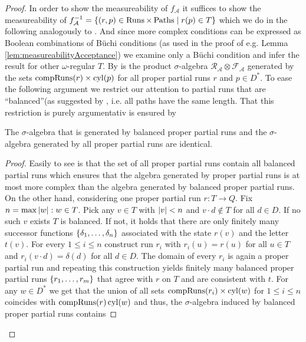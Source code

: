 \begin{proof}
  In order to show the measureability of $f_{\mathcal{A}}$ it suffices to show
  the measureability of $f_{\mathcal{A}}^{-1} =
  \left\{\left(r,p\right)\in\operatorname{Runs}\times\operatorname{Paths}\mid r(p)\in T\right\}$ which we do in the
  following analogously to \cite[Lemma 36]{RandAutoInfTrees}. And since more
  complex conditions can be expressed as Boolean combinations of Büchi
  conditions (as used in the proof of e.g. Lemma
  \ref{lem:measureabilityAcceptance}) we examine only a Büchi condition and
  infer the result for other $\omega$-regular $T$. By
  \cite[Theorem 22.1]{Bauer} is the product $\sigma$-algebra
  $\mathcal{R}_{\mathcal{A}}\otimes\mathcal{F}_{\mathcal{A}}$ generated by the
  sets $\operatorname{compRuns}(r)\times\operatorname{cyl}(p)$ for all proper partial runs $r$ and
  $p\in D^{*}$. To ease the following argument we restrict our attention to
  partial runs that are \enquote{balanced}(as suggested by
  \cite[Remark 35]{RandAutoInfTrees}, i.e. all paths have the same length.
  That this restriction is purely argumentativ is ensured by
  \begin{lemma}
    The $\sigma$-algebra that is generated by balanced proper partial runs and
    the $\sigma$-algebra generated by all proper partial runs are identical.
  \end{lemma}
  \begin{proof}
    Easily to see is that the set of all proper partial runs contain all
    balanced partial runs which ensures that the algebra generated by proper
    partial runs is at most more complex than the algebra generated by balanced
    proper partial runs. On the other hand, considering one proper partial run
    $r:T\rightarrow Q$. Fix $n = \max{\left\vert{w}\right\vert:w\in T}$. Pick any $v\in T$ with
    $\left\vert{v}\right\vert<n$ and $v\cdot d\notin T$ for all $d\in D$. If no such $v$ exists
    $T$ is balanced. If not, it holds that there are only finitely many
    successor functions $\left\{\delta_{1},\dots,\delta_{n}\right\}$ associated with the
    state $r(v)$ and the letter $t(v)$. For every $1\leq i\leq n$ construct run
    $r_{i}$ with $r_{i}(u) = r(u)$ for all $u\in T$ and
    $r_{i}(v\cdot d) = \delta(d)$ for all $d\in D$. The domain of every $r_{i}$
    is again a proper partial run and repeating this construction yields
    finitely many balanced proper partial runs $\left\{r_{1},\dots, r_{m}\right\}$ that
    agree with $r$ on $T$ and are consistent with $t$. For any $w\in D^{*}$ we
    get that the union of all sets $\operatorname{compRuns}(r_{i})\times\operatorname{cyl}(w)$ for
    $1\leq i\leq n$ coincides with $\operatorname{compRuns}(r)\operatorname{cyl}(w)$ and thus,
    the $\sigma$-algebra induced by balanced proper partial runs contains

\end{proof}
\end{proof}
